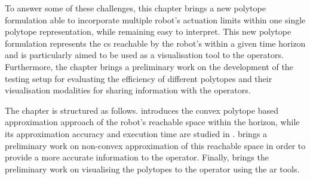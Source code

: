 To answer some of these challenges, this chapter brings a new polytope formulation able to incorporate multiple robot's actuation limits within one single polytope representation, while remaining easy to interpret. This new polytope formulation represents the \gls{cs} reachable by the robot's within a given time horizon and is particularly aimed to be used as a visualisation tool to the operators. Furthermore, the chapter brings a preliminary work on the development of the testing setup for evaluating the efficiency of different polytopes and their visualisation modalities for sharing information with the operators. 

The chapter is structured as follows.  introduces the convex polytope based approximation approach of the robot's reachable space within the horizon, while its approximation accuracy and execution time are studied in .  brings a preliminary work on non-convex approximation of this reachable space in order to provide a more accurate information to the operator. Finally,  brings the preliminary work on visualising the polytopes to the operator using the \gls{ar} tools. 




